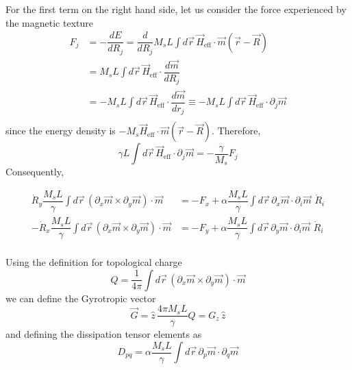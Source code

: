 \documentclass[aps,prb,onecolumn,notitlepage,showpacs,floatfix,superscriptaddress]{revtex4-1}
\newcommand{\mrm}[1]{\mathrm{#1}}
\begin{document}
For the first term on the right hand side, let us consider the force experienced by the magnetic texture
\begin{equation}
\begin{split}
F_j &= - \dfrac{dE}{dR_j} = \dfrac{d}{dR_j} M_s L \int d\vec{r} \, \vec{H}_\mrm{eff} \cdot \vec{m}(\vec{r}-\vec{R}) \\
&=  M_s L \int d\vec{r} \, \vec{H}_\mrm{eff} \cdot \dfrac{d \vec{m}}{dR_j} \\
&= -M_s L \int d\vec{r} \, \vec{H}_\mrm{eff} \cdot \dfrac{d \vec{m}}{dr_j} \equiv  -M_s L \int d\vec{r} \, \vec{H}_\mrm{eff} \cdot \partial_j \vec{m}\\
\end{split}
\end{equation}
since the energy density is $-M_s \vec{H}_\mrm{eff} \cdot \vec{m}(\vec{r}-\vec{R})$. Therefore,
\begin{equation}
\gamma L\int d\vec{r}\,\vec{H}_\mrm{eff} \cdot \partial_j \vec{m} = -\dfrac{\gamma}{M_s} F_j
\end{equation}
Consequently,
\begin{widetext}
\begin{equation}
\begin{split}
\dot{R}_y \dfrac{M_s L}{\gamma}\int d\vec{r}\,(\partial_x \vec{m} \times \partial_y \vec{m}) \cdot  \vec{m} &= -F_x + \alpha \dfrac{M_s L}{\gamma} \int d\vec{r}\, \partial_x \vec{m} \cdot \partial_i \vec{m} \,\, \dot{R}_i  \\
-\dot{R}_x \dfrac{M_s L}{\gamma}\int d\vec{r}\, (\partial_x \vec{m} \times \partial_y \vec{m}) \cdot  \vec{m} &=- F_y + \alpha \dfrac{M_s L}{\gamma} \int d\vec{r}\, \partial_y \vec{m} \cdot \partial_i \vec{m} \,\, \dot{R}_i  \\
\end{split}
\end{equation}
\end{widetext}
Using the definition for topological charge
\begin{equation}
Q = \dfrac{1}{4\pi} \int d\vec{r}\,(\partial_x \vec{m} \times \partial_y \vec{m})\cdot \vec{m}
\end{equation}
we can define the Gyrotropic vector
\begin{equation}
\vec{G} = \hat{z} \, \dfrac{4\pi M_s L}{\gamma} Q = G_z \, \hat{z}
\end{equation}
and defining the dissipation tensor elements as
\begin{equation}
D_{pq} = \alpha \dfrac{M_s L}{\gamma} \int d\vec{r}\, \partial_p \vec{m} \cdot \partial_q \vec{m}
\end{equation}
\end{document}
